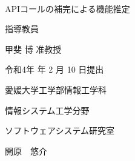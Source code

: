 \pagestyle{empty}
\setlength{\oddsidemargin}{-2.0cm}
\setlength{\textwidth}{20cm}

\
\vspace{3cm}

\begin{center}
{\LARGE {APIコールの補完による機能推定}}\\

\vspace{9mm}

{\Large 指導教員}

\vspace{5mm}

{\Large 甲斐 博 准教授}\\

\vspace{6cm}

{\Large 令和4年 年 2 月 10 日提出}\\

\vspace{20mm}

{\Large 愛媛大学工学部情報工学科}\\

\vspace{4mm}

{\Large 情報システム工学分野}\\

\vspace{4mm}

{\Large ソフトウェアシステム研究室}\\

\vspace{18mm}

{\huge 開原　悠介}\\

\end{center}


